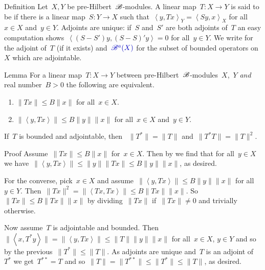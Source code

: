 \documentclass[b]{subfiles}
\begin{document}
\begin{parsec}%
\begin{point}{Definition}%
Let~$X,Y$ be pre-Hilbert~$\mathscr{B}$-modules.
A linear map~$T\colon X \to Y$
    is said to be 
    if there is a linear map~$S \colon Y \to X$
    such that~$\left<y, Tx\right>_Y = \left<Sy, x\right>_X$
    for all~$x \in X$ and~$y \in Y$.
Adjoints are unique:
    if~$S$ and~$S'$ are both adjoints of~$T$
    an easy computation shows~$\left<(S-S')y,(S-S)'y\right>=0$
    for all~$y \in Y$.
We write  for the adjoint of~$T$ (if it exists)
    and~$\Define{\scrB^a(X)}$
    for the subset of bounded operators on~$X$
    which are adjointable.
\end{point}
\begin{point}{Lemma}%
For a linear map~$T \colon X \to Y$
between pre-Hilbert~$\mathscr{B}$-modules~$X$,~$Y$ \emph{and}
real number~$B > 0$
the following are equivalent.
\begin{enumerate}
    \item $\|T x\| \leq B \|x\|$ for all~$x \in X$.
    \item $\|\left<y,Tx\right>\| \leq B \|y\|\|x\|$
            for all~$x \in X$ and~$y \in Y$.
\end{enumerate}
If~$T$ is bounded and adjointable, then 
    ~$\|T^*\| = \|T\|$ and~$\|T^*T\|=\|T\|^2$.
\begin{point}{Proof}%
   Assume~$\|Tx\| \leq B \|x\|$ for~$x \in X$.
   Then by 
   we find that for all~$y \in X$ we have~$\|\left<y, Tx\right>\|
            \leq \|y\|\|Tx\|
            \leq B \|y\|\|x\|$, as desired.

For the converse, pick~$x\in X$
    and assume~$\|\left<y,Tx\right>\| \leq B \|y\|\|x\|$
            for all~$y \in Y$.
Then~$\|Tx \|^2 = \|\left<Tx,Tx\right>\|
                \leq B\|Tx\|\|x\|$.
So~$\|Tx\| \leq B\|Tx\|\|x\|$
    by dividing~$\|Tx\|$ if~$\|Tx\|\neq0$
    and trivially otherwise.

Now assume~$T$ is adjointable and bounded.
Then~$\|\left<x,T^*y\right>\| = \|\left<y, Tx\right>\| \leq \|T\|\|y\|\|x\|$
    for all~$x \in X$, $y\in Y$
    and so by the previous~$\| T^*\| \leq \|T\|$.
As adjoints are unique and~$T$ is an adjoint of~$T^*$
    we get~$T^{**}=T$
    and so~$\|T\| = \|T^{**}\| \leq \|T^*\| \leq \|T\|$, as desired.


\end{point}
\end{point}
\end{parsec}
\end{document}
